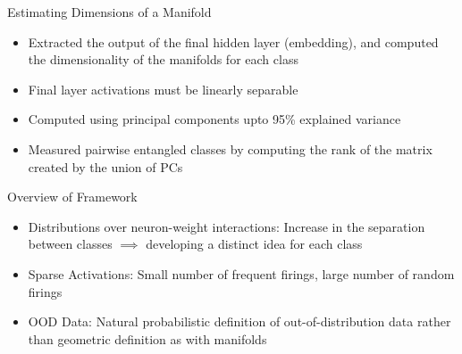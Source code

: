 \documentclass{beamer}
\begin{document}
    

    \begin{frame}{Estimating Dimensions of a Manifold}
        \begin{itemize}
            \setlength\itemsep{1em}
            \item 
                Extracted the output of the final hidden layer (embedding), and computed the dimensionality of the manifolds for each class
            \item 
                Final layer activations must be linearly separable 
            \item 
                Computed using principal components upto 95\% explained variance
            \item 
                Measured pairwise entangled classes by computing the rank of the matrix created by the union of PCs
        \end{itemize}
    \end{frame}

    \begin{frame}{Overview of Framework}
        \begin{itemize}
            \item 
                Distributions over neuron-weight interactions: Increase in the separation between classes $\implies$ developing a distinct idea for each class
            \item 
                Sparse Activations: Small number of frequent firings, large number of random firings
            \item 
                OOD Data: Natural probabilistic definition of out-of-distribution data rather than geometric definition as with manifolds
        \end{itemize}
    \end{frame}
\end{document}
